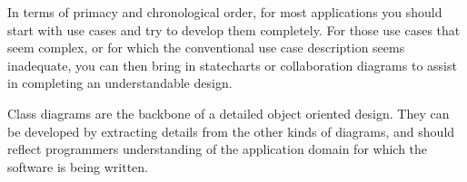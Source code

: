 In terms of primacy and chronological order, for most applications you
should start with use cases and try to develop them completely. For
those use cases that seem complex, or for which the conventional use
case description seems inadequate, you can then bring in statecharts or
collaboration diagrams to assist in completing an understandable
design.

Class diagrams are the backbone of a detailed object oriented design.
They can be developed by extracting details from the other kinds of
diagrams, and should reflect programmers{\textquotesingle}
understanding of the application domain for which the software is being
written.


\bigskip

\clearpage
\bigskip

